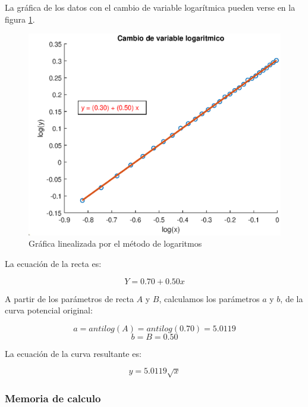 \documentclass[letter,11pt]{article}
\begin{document}
La gráfica de los datos con el cambio de variable logarítmica pueden verse en la
figura \ref{practica34_2}.

\begin{figure}[!h]
\centering
\includegraphics[scale=1.00]{eps/3.4.2.eps}
\caption{Gráfica linealizada por el método de logaritmos}
\label{practica34_2}
\end{figure}

La ecuación de la recta es:

\begin{equation}
    Y = 0.70 + 0.50 x
\end{equation}

A partir de los parámetros de recta $A$ y $B$, calculamos los parámetros $a$ y
$b$, de la curva potencial original:

\begin{equation*}
    a = antilog(A) = antilog(0.70) = 5.0119
\end{equation*}
\begin{equation*}
    b = B = 0.50
\end{equation*}

La ecuación de la curva resultante es:

\begin{equation}
    y = 5.0119 \sqrt{x}
\end{equation}

\subsubsection{Memoria de calculo}
\end{document}
